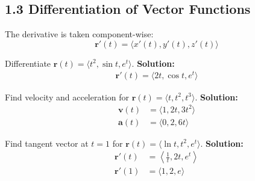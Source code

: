 \subsection*{1.3 Differentiation of Vector Functions}

\begin{conceptbox}
    The derivative is taken component-wise:
    \begin{equation*}
        \mathbf{r}'(t) = \langle x'(t), y'(t), z'(t) \rangle
    \end{equation*}
\end{conceptbox}

\begin{examplebox}
    Differentiate $\mathbf{r}(t)=\langle t^2, \sin t, e^t\rangle$.
    \newline \textbf{Solution:}
    \begin{align*}
        \mathbf{r}'(t)=\langle 2t, \cos t, e^t\rangle
    \end{align*}
\end{examplebox}

\begin{examplebox}
    Find velocity and acceleration for $\mathbf{r}(t)=\langle t, t^2, t^3\rangle$.
    \newline \textbf{Solution:}
    \begin{align*}
        \mathbf{v}(t) & = \langle1,2t,3t^2\rangle \\
        \mathbf{a}(t) & = \langle0,2,6t\rangle
    \end{align*}
\end{examplebox}

\begin{examplebox}
    Find tangent vector at $t=1$ for $\mathbf{r}(t)=\langle \ln t, t^2, e^t\rangle$.
    \newline \textbf{Solution:}
    \begin{align*}
        \mathbf{r}'(t) & = \left\langle \frac{1}{t}, 2t, e^t \right\rangle \\
        \mathbf{r}'(1) & = \langle 1, 2, e \rangle
    \end{align*}
\end{examplebox}